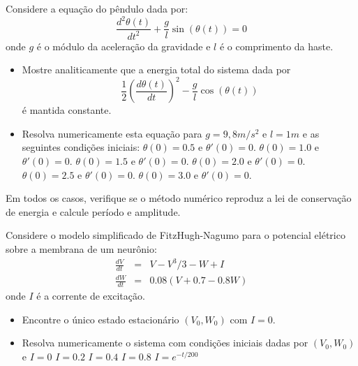 \begin{exer} Considere a equação do pêndulo dada por:
$$\frac{d^2\theta(t)}{dt^2}+\frac{g}{l}\sin(\theta(t))=0$$
onde $g$ é o módulo da aceleração da gravidade e $l$ é o comprimento da haste.
\begin{itemize}
\item Mostre analiticamente que a energia total do sistema dada por
$$\frac{1}{2}\left(\frac{d\theta(t)}{dt}\right)^2-\frac{g}{l}\cos(\theta(t))$$
é mantida constante.
\item Resolva numericamente esta equação para $g=9,8m/s^2$ e $l=1m$ e as seguintes condições iniciais:
\subitem $\theta(0)=0.5$ e $\theta'(0)=0$.
\subitem $\theta(0)=1.0$ e $\theta'(0)=0$.
\subitem $\theta(0)=1.5$ e $\theta'(0)=0$.
\subitem $\theta(0)=2.0$ e $\theta'(0)=0$.
\subitem $\theta(0)=2.5$ e $\theta'(0)=0$.
\subitem $\theta(0)=3.0$ e $\theta'(0)=0$.
\end{itemize}
Em todos os casos, verifique se o método numérico reproduz a lei de conservação de energia e calcule período e amplitude.
\end{exer}

\begin{exer} Considere o modelo simplificado de FitzHugh-Nagumo para o potencial elétrico sobre a membrana de um neurônio:
\begin{eqnarray*}
\frac{d V}{dt}& = &  V-V^3/3 - W +  I  \\
\frac{d W}{dt} & = & 0.08(V+0.7 - 0.8W)
\end{eqnarray*}
onde $I$ é a corrente de excitação.
\begin{itemize}
\item Encontre o único estado estacionário $\left(V_0,W_0\right)$ com $I=0$.
\item Resolva numericamente o sistema com condições iniciais dadas por $\left(V_0,W_0\right)$ e
\subitem $I=0$
\subitem $I=0.2$
\subitem $I=0.4$
\subitem $I=0.8$
\subitem $I=e^{-t/200}$
\end{itemize}
\end{exer}


